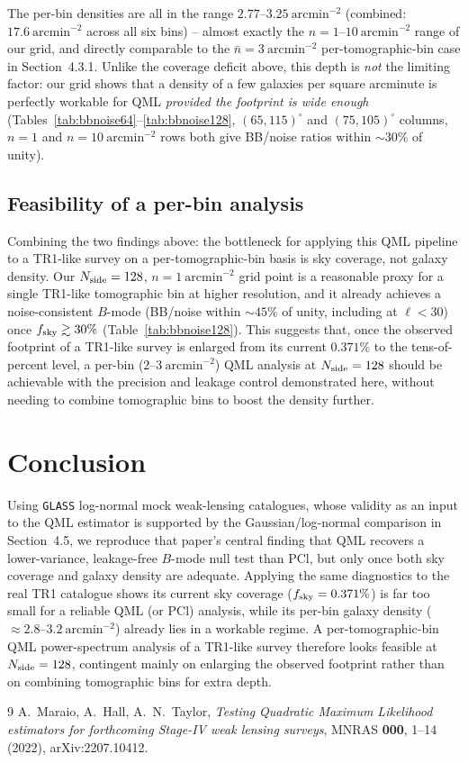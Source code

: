 \documentclass[11pt]{article}
\begin{document}
The per-bin densities are all in the range $2.77$--$3.25\ \mathrm{arcmin}^{-2}$
(combined: $17.6\ \mathrm{arcmin}^{-2}$ across all six bins) -- almost exactly the
$n=1$--$10\ \mathrm{arcmin}^{-2}$ range of our grid, and directly comparable to the
$\bar n=3\ \mathrm{arcmin}^{-2}$ per-tomographic-bin case in \citet{Maraio2022}
Section~4.3.1. Unlike the coverage deficit above, this depth is \emph{not} the limiting
factor: our grid shows that a density of a few galaxies per square arcminute is
perfectly workable for QML \emph{provided the footprint is wide enough}
(Tables~\ref{tab:bbnoise64}--\ref{tab:bbnoise128}, $(65,115)^\circ$ and $(75,105)^\circ$
columns, $n=1$ and $n=10\ \mathrm{arcmin}^{-2}$ rows both give BB/noise ratios within
$\sim\!30\%$ of unity).

\subsection{Feasibility of a per-bin analysis}

Combining the two findings above: the bottleneck for applying this QML pipeline to a
TR1-like survey on a per-tomographic-bin basis is sky coverage, not galaxy density. Our
$N_{\rm side}=128$, $n=1\ \mathrm{arcmin}^{-2}$ grid point is a reasonable proxy for a
single TR1-like tomographic bin at higher resolution, and it already achieves a
noise-consistent $B$-mode (BB/noise within $\sim\!45\%$ of unity, including at
$\ell<30$) once $f_{\rm sky}\gtrsim30\%$ (Table~\ref{tab:bbnoise128}). This suggests
that, once the observed footprint of a TR1-like survey is enlarged from its current
$0.371\%$ to the tens-of-percent level, a per-bin ($2$--$3\ \mathrm{arcmin}^{-2}$) QML
analysis at $N_{\rm side}=128$ should be achievable with the precision and leakage
control demonstrated here, without needing to combine tomographic bins to boost the
density further.

\section{Conclusion}

Using \texttt{GLASS} log-normal mock weak-lensing catalogues, whose validity as an input
to the QML estimator is supported by the Gaussian/log-normal comparison in
\citet{Maraio2022} Section~4.5, we reproduce that paper's central finding that QML
recovers a lower-variance, leakage-free $B$-mode null test than PCl, but only once both
sky coverage and galaxy density are adequate. Applying the same diagnostics to the real
TR1 catalogue shows its current sky coverage ($f_{\rm sky}=0.371\%$) is far too small for
a reliable QML (or PCl) analysis, while its per-bin galaxy density
($\approx 2.8$--$3.2\ \mathrm{arcmin}^{-2}$) already lies in a workable regime. A
per-tomographic-bin QML power-spectrum analysis of a TR1-like survey therefore looks
feasible at $N_{\rm side}=128$, contingent mainly on enlarging the observed footprint
rather than on combining tomographic bins for extra depth.

\begin{thebibliography}{9}
A.~Maraio, A.~Hall, A.~N.~Taylor,
\emph{Testing Quadratic Maximum Likelihood estimators for forthcoming Stage-IV weak
lensing surveys},
MNRAS \textbf{000}, 1--14 (2022), arXiv:2207.10412.
\end{thebibliography}
\end{document}
